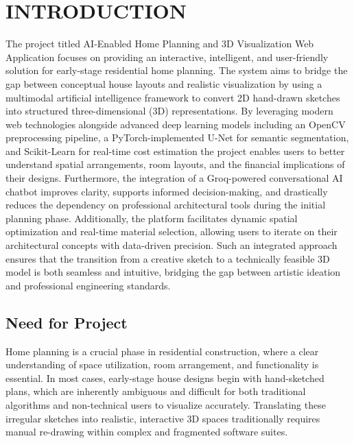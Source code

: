 \documentclass[12pt]{report}
\begin{document}
\newpage
{}
\setcounter{savepage}{\value{page}}

\clearpage
{}
\chapter{INTRODUCTION}

The project titled AI-Enabled Home Planning and 3D Visualization Web Application focuses on providing an interactive, intelligent, and user-friendly solution for early-stage residential home planning. The system aims to bridge the gap between conceptual house layouts and realistic visualization by using a multimodal artificial intelligence framework to convert 2D hand-drawn sketches into structured three-dimensional (3D) representations\cite{liu2017, chen2019}. By leveraging modern web technologies alongside advanced deep learning models including an OpenCV preprocessing pipeline\cite{opencv2024}, a PyTorch-implemented U-Net for semantic segmentation\cite{ronneberger2015}, and Scikit-Learn for real-time cost estimation\cite{sklearn2024} the project enables users to better understand spatial arrangements, room layouts, and the financial implications of their designs\cite{wang2020}. Furthermore, the integration of a Groq-powered conversational AI chatbot\cite{groq2024} improves clarity, supports informed decision-making, and drastically reduces the dependency on professional architectural tools during the initial planning phase\cite{brown2020}. Additionally, the platform facilitates dynamic spatial optimization and real-time material selection, allowing users to iterate on their architectural concepts with data-driven precision. Such an integrated approach ensures that the transition from a creative sketch to a technically feasible 3D model is both seamless and intuitive, bridging the gap between artistic ideation and professional engineering standards.


\section{Need for Project}

Home planning is a crucial phase in residential construction, where a clear understanding of space utilization, room arrangement, and functionality is essential\cite{eastman2018}. In most cases, early-stage house designs begin with hand-sketched plans, which are inherently ambiguous and difficult for both traditional algorithms and non-technical users to visualize accurately\cite{ahmed2018}. Translating these irregular sketches into realistic, interactive 3D spaces traditionally requires manual re-drawing within complex and fragmented software suites\cite{eastman2018}.
\end{document}
